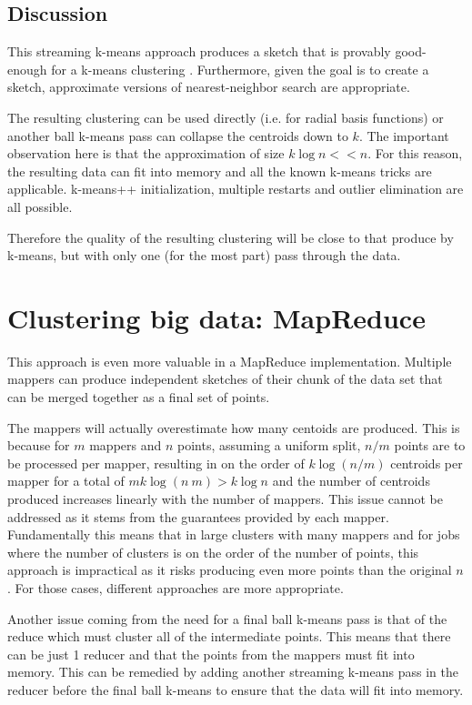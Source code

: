 \documentclass{article}
\begin{document}
\subsection{Discussion}
This streaming k-means approach produces a sketch that is provably good-enough
for a k-means clustering  \cite{skm1, fastskm}. Furthermore, given the
goal is to create a sketch, approximate versions of nearest-neighbor
search are appropriate.

The resulting clustering can be used directly (i.e. for radial basis functions)
or another ball k-means pass can collapse the centroids down to $k$. The
important observation here is that the approximation of size $k \log n << n$.
For this reason, the resulting data can fit into memory and all the known
k-means tricks are applicable. k-means++ initialization, multiple restarts and
outlier elimination are all possible.

Therefore the quality of the resulting clustering will be close to that produce
by k-means, but with only one (for the most part) pass through the data.

\section{Clustering big data: MapReduce}

This approach is even more valuable in a MapReduce implementation. Multiple
mappers can produce independent sketches of their chunk of the data set that
can be merged together as a final set of points.

The mappers will actually
overestimate how many centoids are produced. This is because for $m$ mappers
and $n$ points, assuming a uniform split, $n / m$ points are to be processed
per mapper, resulting in on the order of $k \log (n / m)$ centroids per mapper
for a total of $m k \log (n \ m) > k \log n$ and the number of centroids
produced increases linearly with the number of mappers. This issue cannot be
addressed as it stems from the guarantees provided by each mapper.
Fundamentally this means that in large clusters with many mappers and for jobs
where the number of clusters is on the order of the number of points, this
approach is impractical as it risks producing even more points than the
original $n$. For those cases, different approaches are more appropriate.

Another issue coming from the need for a final ball k-means pass is that of the
reduce which must cluster all of the intermediate points. This means that there
can be just 1 reducer and that the points from the mappers must fit into
memory. This can be remedied by adding another streaming k-means pass in the
reducer before the final ball k-means to ensure that the data will fit into
memory.
\end{document}
